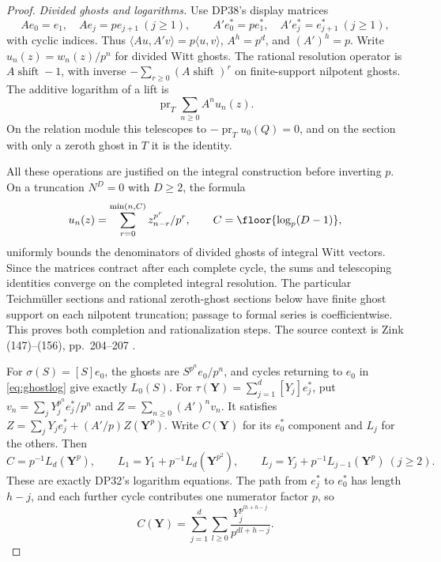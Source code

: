 \begin{proof}
\emph{Divided ghosts and logarithms.}
Use DP38's display matrices
\[
 Ae_0=e_1,\quad Ae_j=pe_{j+1}\ (j\ge1),\qquad
 A'e_0^*=pe_1^*,\quad A'e_j^*=e_{j+1}^*\ (j\ge1),
\]
with cyclic indices. Thus $\langle Au,A'v\rangle=p\langle u,v\rangle$,
$A^h=p^d$, and $(A')^h=p$. Write $u_n(z)=w_n(z)/p^n$ for divided Witt ghosts. The rational resolution operator is $A\operatorname{shift}-1$, with inverse
$-\sum_{r\ge0}(A\operatorname{shift})^r$ on finite-support nilpotent ghosts. The additive logarithm of a lift is
\begin{equation}\label{eq:ghostlog}
 \operatorname{pr}_T\sum_{n\ge0}A^nu_n(z).
\end{equation}
On the relation module this telescopes to $-\operatorname{pr}_Tu_0(Q)=0$, and on the section with only a zeroth ghost in $T$ it is the identity.

All these operations are justified on the integral construction before inverting $p$. On a truncation $N^D=0$ with $D\ge2$, the formula
\[
 u_n(z)=\sum_{r=0}^{\min(n,C)}
              z_{n-r}^{p^r}/p^r,\qquad C=\floor{\log_p(D-1)},
\]
uniformly bounds the denominators of divided ghosts of integral Witt vectors. Since the matrices contract after each complete cycle, the sums and telescoping identities converge on the completed integral resolution. The particular Teichm\"uller sections and rational zeroth-ghost sections below have finite ghost support on each nilpotent truncation; passage to formal series is coefficientwise. This proves both completion and rationalization steps. The source context is Zink (147)--(156), pp.~204--207 \cite{Zink}.

For $\sigma(S)=[S]e_0$, the ghosts are $S^{p^n}e_0/p^n$, and cycles returning to $e_0$ in \eqref{eq:ghostlog} give exactly $L_0(S)$. For $\tau(\mathbf Y)=\sum_{j=1}^d[Y_j]e_j^*$, put
$v_n=\sum_jY_j^{p^n}e_j^*/p^n$ and
$Z=\sum_{n\ge0}(A')^nv_n$. It satisfies
$Z=\sum_jY_je_j^*+(A'/p)Z(\mathbf Y^p)$.
Write $C(\mathbf Y)$ for its $e_0^*$ component and $L_j$ for the others. Then
\[
 C=p^{-1}L_d(\mathbf Y^p),\qquad
 L_1=Y_1+p^{-1}L_d(\mathbf Y^{p^2}),\qquad
 L_j=Y_j+p^{-1}L_{j-1}(\mathbf Y^p)\ (j\ge2).
\]
These are exactly DP32's logarithm equations. The path from $e_j^*$ to $e_0^*$ has length $h-j$, and each further cycle contributes one numerator factor $p$, so
\[
 C(\mathbf Y)=\sum_{j=1}^d\sum_{l\ge0}
                \frac{Y_j^{p^{lh+h-j}}}{p^{dl+h-j}}.
\]


\end{proof}
